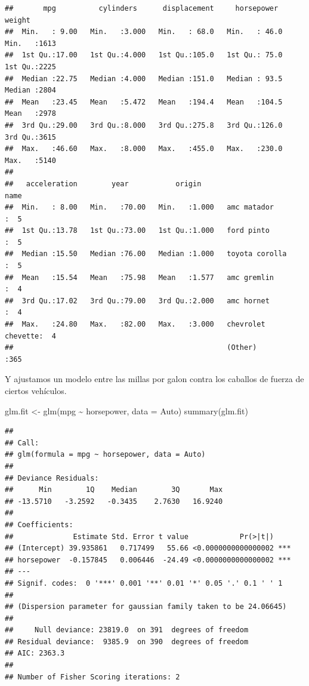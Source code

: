 \documentclass[
  12pt,
]{book}
\newenvironment{Shaded}{\begin{snugshade}}{\end{snugshade}}
\newcommand{\AttributeTok}[1]{\textcolor[rgb]{0.77,0.63,0.00}{#1}}
\newcommand{\FunctionTok}[1]{\textcolor[rgb]{0.00,0.00,0.00}{#1}}
\newcommand{\NormalTok}[1]{#1}
\newcommand{\OtherTok}[1]{\textcolor[rgb]{0.56,0.35,0.01}{#1}}
\newcommand{\SpecialCharTok}[1]{\textcolor[rgb]{0.00,0.00,0.00}{#1}}
\begin{document}
\begin{verbatim}
##       mpg          cylinders      displacement     horsepower        weight    
##  Min.   : 9.00   Min.   :3.000   Min.   : 68.0   Min.   : 46.0   Min.   :1613  
##  1st Qu.:17.00   1st Qu.:4.000   1st Qu.:105.0   1st Qu.: 75.0   1st Qu.:2225  
##  Median :22.75   Median :4.000   Median :151.0   Median : 93.5   Median :2804  
##  Mean   :23.45   Mean   :5.472   Mean   :194.4   Mean   :104.5   Mean   :2978  
##  3rd Qu.:29.00   3rd Qu.:8.000   3rd Qu.:275.8   3rd Qu.:126.0   3rd Qu.:3615  
##  Max.   :46.60   Max.   :8.000   Max.   :455.0   Max.   :230.0   Max.   :5140  
##                                                                                
##   acceleration        year           origin                      name    
##  Min.   : 8.00   Min.   :70.00   Min.   :1.000   amc matador       :  5  
##  1st Qu.:13.78   1st Qu.:73.00   1st Qu.:1.000   ford pinto        :  5  
##  Median :15.50   Median :76.00   Median :1.000   toyota corolla    :  5  
##  Mean   :15.54   Mean   :75.98   Mean   :1.577   amc gremlin       :  4  
##  3rd Qu.:17.02   3rd Qu.:79.00   3rd Qu.:2.000   amc hornet        :  4  
##  Max.   :24.80   Max.   :82.00   Max.   :3.000   chevrolet chevette:  4  
##                                                  (Other)           :365
\end{verbatim}

Y ajustamos un modelo entre las millas por galon contra los caballos de
fuerza de ciertos vehículos.

\begin{Shaded}
\begin{Highlighting}[]
\NormalTok{glm.fit }\OtherTok{\textless{}{-}} \FunctionTok{glm}\NormalTok{(mpg }\SpecialCharTok{\textasciitilde{}}\NormalTok{ horsepower, }\AttributeTok{data =}\NormalTok{ Auto)}
\FunctionTok{summary}\NormalTok{(glm.fit)}
\end{Highlighting}
\end{Shaded}

\begin{verbatim}
## 
## Call:
## glm(formula = mpg ~ horsepower, data = Auto)
## 
## Deviance Residuals: 
##      Min        1Q    Median        3Q       Max  
## -13.5710   -3.2592   -0.3435    2.7630   16.9240  
## 
## Coefficients:
##              Estimate Std. Error t value            Pr(>|t|)    
## (Intercept) 39.935861   0.717499   55.66 <0.0000000000000002 ***
## horsepower  -0.157845   0.006446  -24.49 <0.0000000000000002 ***
## ---
## Signif. codes:  0 '***' 0.001 '**' 0.01 '*' 0.05 '.' 0.1 ' ' 1
## 
## (Dispersion parameter for gaussian family taken to be 24.06645)
## 
##     Null deviance: 23819.0  on 391  degrees of freedom
## Residual deviance:  9385.9  on 390  degrees of freedom
## AIC: 2363.3
## 
## Number of Fisher Scoring iterations: 2
\end{verbatim}
\end{document}
